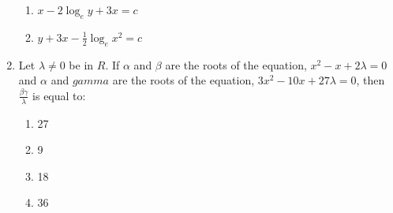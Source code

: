 \documentclass[journal]{IEEEtran}
\begin{document}
\begin{enumerate}
\begin{enumerate}
			\item $x - 2\log_{e}{y+3x} = c$
			\item $y + 3x - \frac{1}{2}\log_{e}{x}^{2} = c$
		\end{enumerate}
	\item 
	Let $\lambda \neq 0$ be in $R$. If $\alpha$ and $\beta$ are the roots of the equation, $x^{2}-x+2\lambda = 0$ and $\alpha$ and $gamma$ are the roots of the equation, $3x^{2}-10x+27\lambda = 0$, then $\frac{\beta\gamma}{\lambda}$ is equal to:
		\begin{enumerate}
			\item 27
			\item 9
			\item 18
			\item 36
		\end{enumerate}
\end{enumerate}
\end{document}

